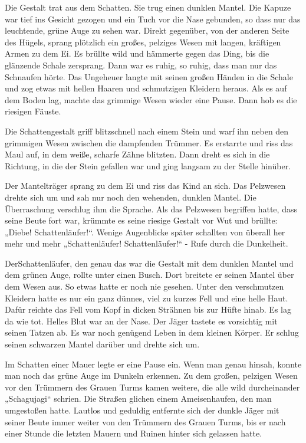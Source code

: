 \documentclass[12pt,a4paper,onecolumn,twoside,ngerman]{book}
\newcommand{\Schattenjager}{Schattenläufer}
\begin{document}
Die Gestalt trat aus dem Schatten. Sie trug einen dunklen Mantel. Die Kapuze war tief ins Gesicht gezogen und ein Tuch vor die Nase gebunden, so dass nur das leuchtende, grüne Auge zu sehen war. Direkt gegenüber, von der anderen Seite des Hügels, sprang plötzlich ein großes, pelziges Wesen mit langen, kräftigen Armen zu dem Ei. Es brüllte wild und hämmerte gegen das Ding, bis die glänzende Schale zersprang. Dann war es ruhig, so ruhig, dass man nur das Schnaufen hörte. Das Ungeheuer langte mit seinen großen Händen in die Schale und zog etwas mit hellen Haaren und schmutzigen Kleidern heraus. Als es auf dem Boden lag, machte das grimmige Wesen wieder eine Pause. Dann hob es die riesigen Fäuste. 

Die Schattengestalt griff blitzschnell nach einem Stein und warf ihn neben den grimmigen Wesen zwischen die dampfenden Trümmer. Es erstarrte und riss das Maul auf, in dem weiße, scharfe Zähne blitzten. Dann dreht es sich in die Richtung, in die der Stein gefallen war und ging langsam zu der Stelle hinüber. 

Der Mantelträger sprang zu dem Ei und riss das Kind an sich. Das Pelzwesen drehte sich um und sah nur noch den wehenden, dunklen Mantel. Die Überraschung verschlug ihm die Sprache. Als das Pelzwesen begriffen hatte, dass seine Beute fort war, krümmte es seine riesige Gestalt vor Wut und brüllte: „Diebe! \Schattenjager!“. Wenige Augenblicke später schallten von überall her mehr und mehr „\Schattenjager! \Schattenjager!“ - Rufe durch die Dunkelheit.

Der\Schattenjager, den genau das war die Gestalt mit dem dunklen Mantel und dem grünen Auge, rollte unter einen Busch. Dort breitete er seinen Mantel über dem Wesen aus. So etwas hatte er noch nie gesehen. Unter den verschmutzen Kleidern hatte es nur ein ganz dünnes, viel zu kurzes Fell und eine helle Haut. Dafür reichte das Fell vom Kopf in dicken Strähnen bis zur Hüfte hinab. Es lag da wie tot. Helles Blut war an der Nase. Der Jäger tastete es vorsichtig mit seinen Tatzen ab. Es war noch genügend Leben in dem kleinen Körper. Er schlug seinen schwarzen Mantel darüber und drehte sich um.

Im Schatten einer Mauer legte er eine Pause ein. Wenn man genau hinsah, konnte man noch das grüne Auge im Dunkeln erkennen. Zu dem großen, pelzigen Wesen vor den Trümmern des Grauen Turms kamen weitere, die alle wild durcheinander „Schagujagi“ schrien. Die Straßen glichen einem Ameisenhaufen, den man umgestoßen hatte. Lautlos und geduldig entfernte sich der dunkle Jäger mit seiner Beute immer weiter von den Trümmern des Grauen Turms, bis er nach einer Stunde die letzten Mauern und Ruinen hinter sich gelassen hatte.
\end{document}
